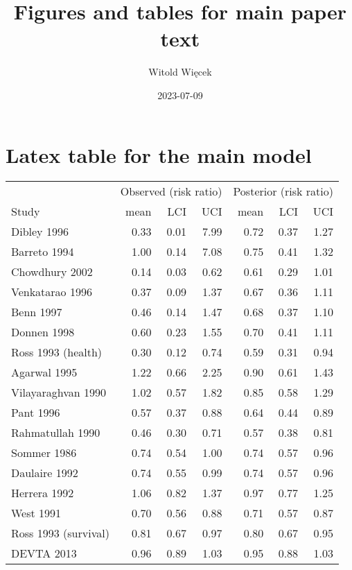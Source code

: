 \documentclass[
]{article}
\title{Figures and tables for main paper text}
\author{Witold Więcek}
\date{2023-07-09}
\begin{document}
\maketitle

\hypertarget{latex-table-for-the-main-model}{%
\section{Latex table for the main
model}\label{latex-table-for-the-main-model}}

\begin{tabular}[t]{lrrrrrr}
\toprule
\multicolumn{1}{c}{} & \multicolumn{3}{c}{Observed (risk ratio)} & \multicolumn{3}{c}{Posterior (risk ratio)} \\
\cmidrule(l{3pt}r{3pt}){2-4} \cmidrule(l{3pt}r{3pt}){5-7}
Study & mean & LCI & UCI & mean & LCI & UCI\\
\midrule
Dibley 1996 & 0.33 & 0.01 & 7.99 & 0.72 & 0.37 & 1.27\\
Barreto 1994 & 1.00 & 0.14 & 7.08 & 0.75 & 0.41 & 1.32\\
Chowdhury 2002 & 0.14 & 0.03 & 0.62 & 0.61 & 0.29 & 1.01\\
Venkatarao 1996 & 0.37 & 0.09 & 1.37 & 0.67 & 0.36 & 1.11\\
Benn 1997 & 0.46 & 0.14 & 1.47 & 0.68 & 0.37 & 1.10\\
\addlinespace
Donnen 1998 & 0.60 & 0.23 & 1.55 & 0.70 & 0.41 & 1.11\\
Ross 1993 (health) & 0.30 & 0.12 & 0.74 & 0.59 & 0.31 & 0.94\\
Agarwal 1995 & 1.22 & 0.66 & 2.25 & 0.90 & 0.61 & 1.43\\
Vilayaraghvan 1990 & 1.02 & 0.57 & 1.82 & 0.85 & 0.58 & 1.29\\
Pant 1996 & 0.57 & 0.37 & 0.88 & 0.64 & 0.44 & 0.89\\
\addlinespace
Rahmatullah 1990 & 0.46 & 0.30 & 0.71 & 0.57 & 0.38 & 0.81\\
Sommer 1986 & 0.74 & 0.54 & 1.00 & 0.74 & 0.57 & 0.96\\
Daulaire 1992 & 0.74 & 0.55 & 0.99 & 0.74 & 0.57 & 0.96\\
Herrera 1992 & 1.06 & 0.82 & 1.37 & 0.97 & 0.77 & 1.25\\
West 1991 & 0.70 & 0.56 & 0.88 & 0.71 & 0.57 & 0.87\\
\addlinespace
Ross 1993 (survival) & 0.81 & 0.67 & 0.97 & 0.80 & 0.67 & 0.95\\
DEVTA 2013 & 0.96 & 0.89 & 1.03 & 0.95 & 0.88 & 1.03\\
\bottomrule
\end{tabular}
\end{document}
